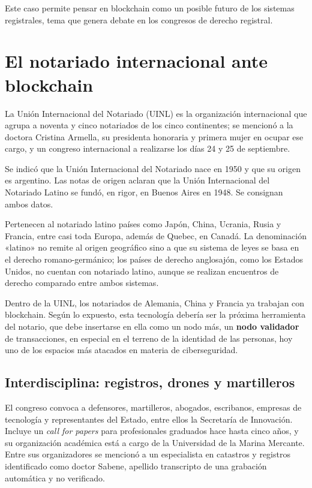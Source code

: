 \documentclass[12pt,oneside]{book}
\begin{document}
Este caso permite pensar en blockchain como un posible futuro de los sistemas registrales, tema que genera debate en los congresos de derecho registral.

\section{El notariado internacional ante blockchain}

La Unión Internacional del Notariado (UINL) es la organización internacional que agrupa a noventa y cinco notariados de los cinco continentes; se mencionó a la doctora Cristina Armella, su presidenta honoraria y primera mujer en ocupar ese cargo, y un congreso internacional a realizarse los días 24 y 25 de septiembre.

\begin{note}
Se indicó que la Unión Internacional del Notariado nace en 1950 y que su origen es argentino. Las notas de origen aclaran que la Unión Internacional del Notariado Latino se fundó, en rigor, en Buenos Aires en 1948. Se consignan ambos datos.
\end{note}

Pertenecen al notariado latino países como Japón, China, Ucrania, Rusia y Francia, entre casi toda Europa, además de Quebec, en Canadá. La denominación «latino» no remite al origen geográfico sino a que su sistema de leyes se basa en el derecho romano-germánico; los países de derecho anglosajón, como los Estados Unidos, no cuentan con notariado latino, aunque se realizan encuentros de derecho comparado entre ambos sistemas.

Dentro de la UINL, los notariados de Alemania, China y Francia ya trabajan con blockchain. Según lo expuesto, esta tecnología debería ser la próxima herramienta del notario, que debe insertarse en ella como un nodo más, un \textbf{nodo validador} de transacciones, en especial en el terreno de la identidad de las personas, hoy uno de los espacios más atacados en materia de ciberseguridad.

\subsection{Interdisciplina: registros, drones y martilleros}

El congreso convoca a defensores, martilleros, abogados, escribanos, empresas de tecnología y representantes del Estado, entre ellos la Secretaría de Innovación. Incluye un \emph{call for papers} para profesionales graduados hace hasta cinco años, y su organización académica está a cargo de la Universidad de la Marina Mercante. Entre sus organizadores se mencionó a un especialista en catastros y registros identificado como doctor Sabene, apellido transcripto de una grabación automática y no verificado.
\end{document}
